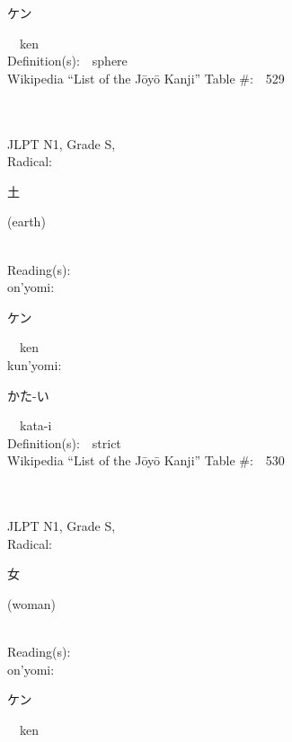 \begin{multicols}{2}
{\hspace*{2em}}{\begin{CJK}{UTF8}{min} ケン \end{CJK}}\ \ ken\ \ \\
Definition(s):\ \ sphere \\
Wikipedia ``List of the J\=oy\=o Kanji'' Table \#:\ \ 529 \\
\ \ \\
{\fontsize{34pt}{40pt}  }\ \ \\
{JLPT N1, Grade S, \\Radical:\ \ {\begin{CJK}{UTF8}{min} 土 \end{CJK}} (earth) } \\
Reading(s):\ \ \\
{\hspace*{1em}}on'yomi:\ \ \\
{\hspace*{2em}}{\begin{CJK}{UTF8}{min} ケン \end{CJK}}\ \ ken\ \ \\
{\hspace*{1em}}kun'yomi:\ \ \\
{\hspace*{2em}}{\begin{CJK}{UTF8}{min} かた-い \end{CJK}}\ \ kata-i\ \ \\
Definition(s):\ \ strict \\
Wikipedia ``List of the J\=oy\=o Kanji'' Table \#:\ \ 530 \\
\ \ \\
{\fontsize{34pt}{40pt}  }\ \ \\
{JLPT N1, Grade S, \\Radical:\ \ {\begin{CJK}{UTF8}{min} 女 \end{CJK}} (woman) } \\
Reading(s):\ \ \\
{\hspace*{1em}}on'yomi:\ \ \\
{\hspace*{2em}}{\begin{CJK}{UTF8}{min} ケン \end{CJK}}\ \ ken\ \ \\

\end{multicols}
